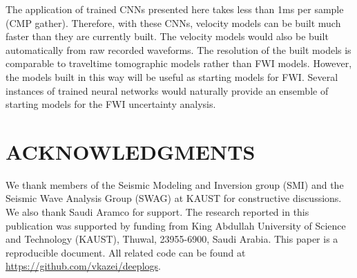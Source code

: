 \documentclass[manuscript]{geophysics}
\begin{document}
The application of trained CNNs presented here takes less than 1ms per sample (CMP gather). Therefore, with these CNNs, velocity models can be built much faster than they are currently built. The velocity models would also be built automatically from raw recorded waveforms. The resolution of the built models is comparable to traveltime tomographic models rather than FWI models. However, the models built in this way will be useful as starting models for FWI. Several instances of trained neural networks would naturally provide an ensemble of starting models for the FWI uncertainty analysis. 

\section{ACKNOWLEDGMENTS}

We thank members of the Seismic Modeling and Inversion group (SMI) and the Seismic Wave Analysis Group (SWAG) at KAUST for constructive discussions. We also thank Saudi Aramco for support.
The research reported in this publication was supported by funding from King Abdullah University of Science and Technology (KAUST), Thuwal, 23955-6900, Saudi Arabia.
%
This paper is a reproducible document. All related code can be found at \href{https://github.com/vkazei/deeplogs}{https://github.com/vkazei/deeplogs}.




\newpage


\end{document}
